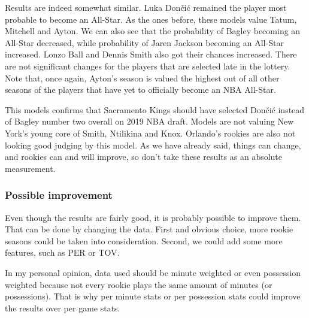 \documentclass[a4paper]{article}
\begin{document}
Results are indeed somewhat similar. Luka Dončić remained the player most probable to become an All-Star. As the ones before, these models value Tatum, Mitchell and Ayton. We can also see that the probability of Bagley becoming an All-Star decreased, while probability of Jaren Jackson becoming an All-Star increased. Lonzo Ball and Dennis Smith  also got their chances increased. There are not significant changes for the players that are selected late in the lottery. Note that, once again, Ayton's season is valued the highest out of all other seasons of the players that have yet to officially become an NBA All-Star.

This models confirms that Sacramento Kings should have selected Dončić instead of Bagley number two overall on 2019 NBA draft. Models are not valuing New York's young core of Smith, Ntilikina and Knox. Orlando's rookies are also not looking good judging by this model. As we have already said, things can change, and rookies can and will improve, so don't take these results as an absolute measurement.

\subsubsection{Possible improvement}
\label{subsubsec:improvement_all_star}

Even though the results are fairly good, it is probably possible to improve them. That can be done by changing the data. First and obvious choice, more rookie seasons could be taken into consideration. Second, we could add some more features, such as PER or TOV. 

In my personal opinion, data used should be minute weighted or even possession weighted because not every rookie plays the same amount of minutes (or possessions). That is why per minute stats or per possession stats could improve the results over per game stats.


\pagebreak

\appendix


\appendix
\end{document}
